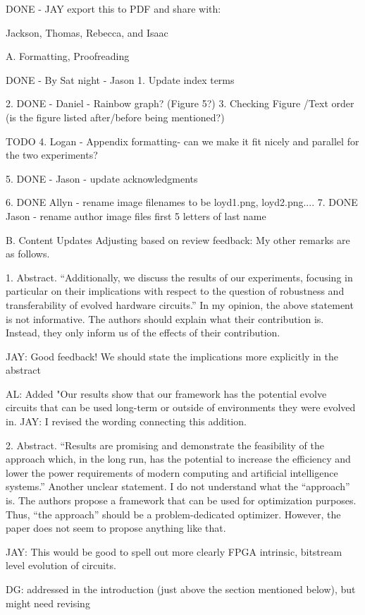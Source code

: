 DONE - JAY export this to PDF and share with:

Jackson, Thomas, Rebecca, and Isaac


A. Formatting, Proofreading

DONE  - By Sat night - Jason 1. Update index terms

2. DONE - Daniel - Rainbow graph? (Figure 5?)
3. Checking Figure /Text order (is the figure listed after/before being mentioned?)

TODO 4. Logan - Appendix formatting- can we make it fit nicely and parallel for the two experiments?

5. DONE - Jason - update acknowledgments

6. DONE Allyn - rename image filenames to be loyd1.png, loyd2.png....
7. DONE Jason - rename author image files first 5 letters of last name



B. Content Updates
Adjusting based on review feedback:
My other remarks are as follows. 

1. Abstract. “Additionally, we discuss the results of our experiments, focusing in particular on their implications with respect to the question of robustness and transferability of evolved hardware circuits.” In my opinion, the above statement is not informative. The authors should explain what their contribution is. Instead, they only inform us of the effects of their contribution. 

JAY: Good feedback! We should state the implications more explicitly in the abstract

AL: Added "Our results show that our framework has the potential evolve circuits that can be used long-term or outside of environments they were evolved in.
JAY: I revised the wording connecting this addition.


2. Abstract. “Results are promising and demonstrate the feasibility of the approach which, in the long run, has the potential to increase the efficiency and lower the power requirements of modern computing and artificial intelligence systems.” Another unclear statement. I do not understand what the “approach” is. The authors propose a framework that can be used for optimization purposes. Thus, “the approach” should be a problem-dedicated optimizer. However, the paper does not seem to propose anything like that. 

JAY: This would be good to spell out more clearly FPGA intrinsic, bitstream level evolution of circuits. 

DG: addressed in the introduction (just above the section mentioned below), but might need revising


